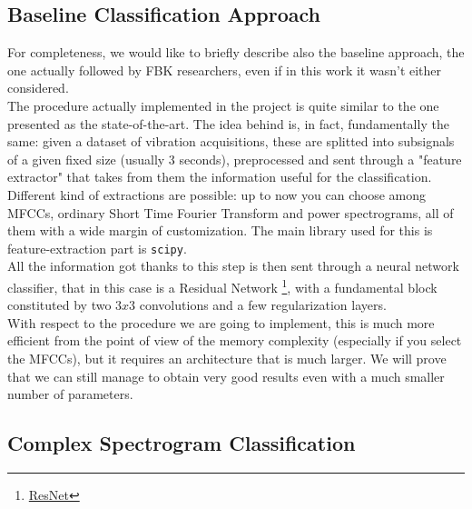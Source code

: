 \documentclass[../main.tex]{subfiles}
\begin{document}
\subsection{Baseline Classification Approach}

For completeness, we would like to briefly describe also the baseline approach, the one actually followed by FBK researchers, even if in this work it wasn't either considered.\\
The procedure actually implemented in the project is quite similar to the one presented as the state-of-the-art. The idea behind is, in fact, fundamentally the same: given a dataset of vibration acquisitions, these are splitted into subsignals of a given fixed size (usually 3 seconds), preprocessed and sent through a "feature extractor" that takes from them the information useful for the classification. Different kind of extractions are possible: up to now you can choose among MFCCs, ordinary Short Time Fourier Transform and power spectrograms, all of them with a wide margin of customization. The main library used for this is feature-extraction part is \texttt{scipy}.\\
All the information got thanks to this step is then sent through a neural network classifier, that in this case is a Residual Network \footnote{\href{https://en.wikipedia.org/wiki/Residual\_neural\_network}{ResNet}}, with a fundamental block constituted by two $3x3$ convolutions and a few regularization layers.\\
With respect to the procedure we are going to implement, this is much more efficient from the point of view of the memory complexity (especially if you select the MFCCs), but it requires an architecture that is much larger. We will prove that we can still manage to obtain very good results even with a much smaller number of parameters.

\subsection{Complex Spectrogram Classification}
\end{document}
